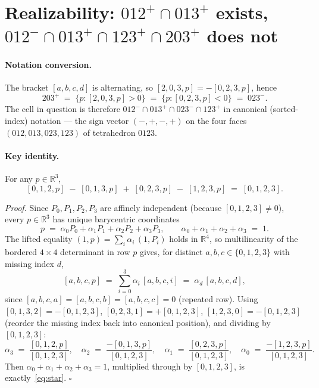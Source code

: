 \documentclass[11pt]{article}
\begin{document}
\section*{Realizability: \texorpdfstring{$012^+\cap 013^+$}{012+ cap 013+} exists, \texorpdfstring{$012^-\cap 013^+\cap 123^+\cap 203^+$}{012- cap 013+ cap 123+ cap 203+} does not}

\paragraph{Notation conversion.} The bracket $[a,b,c,d]$ is alternating, so
$[2,0,3,p] = -[0,2,3,p]$, hence
\[
203^+ \;=\; \{p : [2,0,3,p] > 0\} \;=\; \{p : [0,2,3,p] < 0\} \;=\; 023^-.
\]
The cell in question is therefore $012^- \cap 013^+ \cap 023^- \cap 123^+$ in
canonical (sorted-index) notation --- the sign vector $(-,+,-,+)$ on the four
faces $(012, 013, 023, 123)$ of tetrahedron $0123$.

\paragraph{Key identity.} For any $p \in \mathbb{R}^3$,
\begin{equation}\label{eq:star}\tag{$\star$}
[0,1,2,p] \;-\; [0,1,3,p] \;+\; [0,2,3,p] \;-\; [1,2,3,p] \;=\; [0,1,2,3].
\end{equation}

\textit{Proof.} Since $P_0, P_1, P_2, P_3$ are affinely independent (because
$[0,1,2,3] \neq 0$), every $p \in \mathbb{R}^3$ has unique barycentric coordinates
\[
p \;=\; \alpha_0 P_0 + \alpha_1 P_1 + \alpha_2 P_2 + \alpha_3 P_3,
\qquad \alpha_0+\alpha_1+\alpha_2+\alpha_3 \;=\; 1.
\]
The lifted equality $(1,p) = \sum_i \alpha_i\,(1,P_i)$ holds in $\mathbb{R}^4$, so
multilinearity of the bordered $4\times 4$ determinant in row $p$ gives, for
distinct $a,b,c \in \{0,1,2,3\}$ with missing index $d$,
\[
[a,b,c,p] \;=\; \sum_{i=0}^{3} \alpha_i\, [a,b,c,i] \;=\; \alpha_d\, [a,b,c,d],
\]
since $[a,b,c,a] = [a,b,c,b] = [a,b,c,c] = 0$ (repeated row). Using
$[0,1,3,2] = -[0,1,2,3]$, $[0,2,3,1] = +[0,1,2,3]$, $[1,2,3,0] = -[0,1,2,3]$
(reorder the missing index back into canonical position), and dividing by
$[0,1,2,3]$:
\[
\alpha_3 \;=\; \frac{[0,1,2,p]}{[0,1,2,3]},\quad
\alpha_2 \;=\; \frac{-[0,1,3,p]}{[0,1,2,3]},\quad
\alpha_1 \;=\; \frac{[0,2,3,p]}{[0,1,2,3]},\quad
\alpha_0 \;=\; \frac{-[1,2,3,p]}{[0,1,2,3]}.
\]
Then $\alpha_0 + \alpha_1 + \alpha_2 + \alpha_3 = 1$, multiplied through by
$[0,1,2,3]$, is exactly~\eqref{eq:star}. \hfill$\square$
\end{document}
